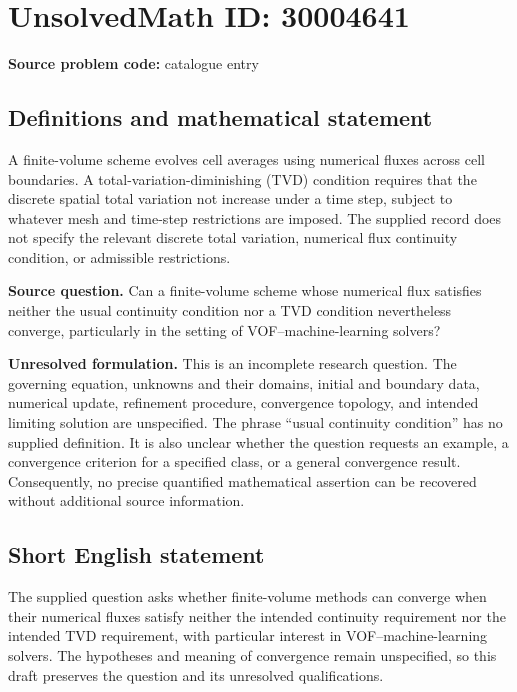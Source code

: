 \documentclass[11pt]{article}
\begin{document}
\section*{UnsolvedMath ID: 30004641}
\textbf{Source problem code:} catalogue entry
\subsection{Definitions and mathematical statement}
A finite-volume scheme evolves cell averages using numerical fluxes across cell boundaries. A total-variation-diminishing (TVD) condition requires that the discrete spatial total variation not increase under a time step, subject to whatever mesh and time-step restrictions are imposed. The supplied record does not specify the relevant discrete total variation, numerical flux continuity condition, or admissible restrictions.

\textbf{Source question.} Can a finite-volume scheme whose numerical flux satisfies neither the usual continuity condition nor a TVD condition nevertheless converge, particularly in the setting of VOF--machine-learning solvers?

\textbf{Unresolved formulation.} This is an incomplete research question. The governing equation, unknowns and their domains, initial and boundary data, numerical update, refinement procedure, convergence topology, and intended limiting solution are unspecified. The phrase ``usual continuity condition'' has no supplied definition. It is also unclear whether the question requests an example, a convergence criterion for a specified class, or a general convergence result. Consequently, no precise quantified mathematical assertion can be recovered without additional source information.
\subsection{Short English statement}
The supplied question asks whether finite-volume methods can converge when their numerical fluxes satisfy neither the intended continuity requirement nor the intended TVD requirement, with particular interest in VOF--machine-learning solvers. The hypotheses and meaning of convergence remain unspecified, so this draft preserves the question and its unresolved qualifications.
\end{document}
